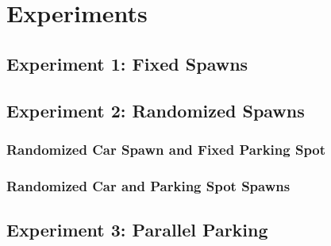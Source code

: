 \chapter{Experiments}
\section{Experiment 1: Fixed Spawns}
\section{Experiment 2: Randomized Spawns}
\subsection{Randomized Car Spawn and Fixed Parking Spot}
\subsection{Randomized Car and Parking Spot Spawns}
\section{Experiment 3: Parallel Parking}